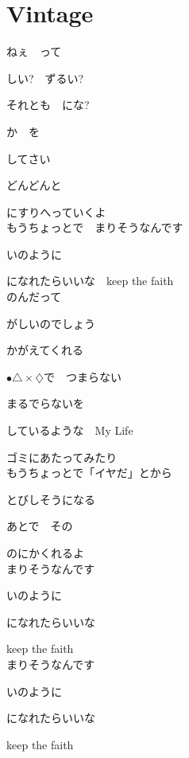 \section{ Vintage}
\large{

ねぇ　って

しい?　ずるい?

それとも　にな?

か　を

してさい

どんどんと

にすりへっていくよ
\\

もうちょっとで　まりそうなんです

いのように

になれたらいいな　keep the faith
\\

のんだって

がしいのでしょう

かがえてくれる

$\bullet \triangle \times \diamondsuit$で　つまらない

まるでらないを

しているような　My Life

ゴミにあたってみたり
\\

もうちょっとで「イヤだ」とから

とびしそうになる

あとで　その

のにかくれるよ
\\

まりそうなんです

いのように

になれたらいいな　

keep the faith
\\

まりそうなんです

いのように

になれたらいいな　

keep the faith

}